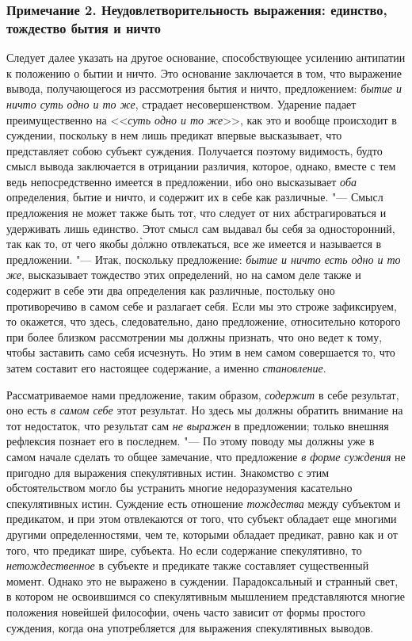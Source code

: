 \subsubsection[Примечание 2. Неудовлетворительность выражения: единство, тождество бытия и ничто]
{Примечание 2. Неудовлетворительность выражения: единство, тождество бытия и ничто}

Следует далее указать на другое основание, способствующее усилению антипатии
к положению о бытии и ничто. Это основание заключается в том, что выражение
вывода, получающегося из рассмотрения бытия и ничто, предложением:
{\em бытие и ничто суть одно и то же}, страдает
несовершенством. Ударение падает преимущественно на
<<{\em суть одно и то же}>>, как это и вообще происходит
в суждении, поскольку в нем лишь предикат впервые высказывает, что
представляет собою субъект суждения. Получается поэтому видимость, будто
смысл вывода заключается в отрицании различия, которое, однако, вместе с
тем ведь непосредственно имеется в предложении, ибо оно высказывает
{\em оба} определения, бытие и ничто, и содержит их в
себе как различные. "--- Смысл предложения не может также быть тот, что
следует от них абстрагироваться и удерживать лишь единство. Этот смысл сам
выдавал бы себя за односторонний, так как то, от чего якобы д\`{о}лжно
отвлекаться, все же имеется и называется в предложении. "--- Итак, поскольку
предложение: {\em бытие и ничто есть одно и то же},
высказывает тождество этих определений, но на самом деле также и содержит в
себе эти два определения как различные, постольку оно противоречиво в самом
себе и разлагает себя. Если мы это строже зафиксируем, то окажется, что
здесь, следовательно, дано предложение, относительно которого при более
близком рассмотрении мы должны признать, что оно ведет к тому, чтобы
заставить само себя исчезнуть. Но этим в нем самом совершается то, что
затем составит его настоящее содержание, а именно
{\em становление}.

Рассматриваемое нами предложение, таким образом,
{\em содержит} в себе результат, оно есть
{\em в самом себе} этот результат. Но здесь мы должны
обратить внимание на тот недостаток, что результат сам
{\em не выражен} в предложении; только внешняя
рефлексия познает его в последнем. "--- По этому поводу мы должны уже в самом
начале сделать то общее замечание, что предложение
{\em в форме суждения} не пригодно для выражения
спекулятивных истин. Знакомство с этим обстоятельством могло бы устранить
многие недоразумения касательно спекулятивных истин. Суждение есть
отношение {\em тождества} между субъектом и предикатом,
и при этом отвлекаются от того, что субъект обладает еще многими другими
определенностями, чем те, которыми обладает предикат, равно как и от того,
что предикат шире, субъекта. Но если содержание спекулятивно, то
{\em нетождественное} в субъекте и предикате также
составляет существенный момент. Однако это не выражено в суждении.
Парадоксальный и странный свет, в котором не освоившимся со спекулятивным
мышлением представляются многие положения новейшей философии, очень часто
зависит от формы простого суждения, когда она употребляется для выражения
спекулятивных выводов.

